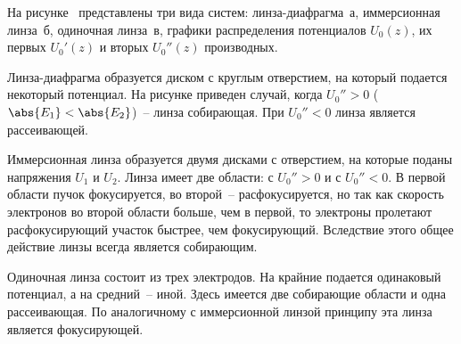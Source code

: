 На рисунке~ представлены три вида систем: линза-диафрагма~а,
иммерсионная линза~б, одиночная линза~в, графики распределения потенциалов
\( U_0(z) \), их первых \( U_0'(z) \) и вторых \( U_0''(z) \) производных.

Линза-диафрагма образуется диском с круглым отверстием, на который подается
некоторый потенциал. На рисунке приведен случай, когда \( U_0'' > 0 \)
(\( \abs{E_1} < \abs{E_2} \))~-- линза собирающая. При \( U_0'' < 0 \) линза
является рассеивающей.

Иммерсионная линза образуется двумя дисками с отверстием, на которые поданы
напряжения \( U_1 \) и \( U_2 \). Линза имеет две области: с \( U_0'' > 0 \) и
с \( U_0'' < 0 \). В первой области пучок фокусируется, во второй~--
расфокусируется, но так как скорость электронов во второй области больше, чем в
первой, то электроны пролетают расфокусирующий участок быстрее, чем
фокусирующий. Вследствие этого общее действие линзы всегда является собирающим.

Одиночная линза состоит из трех электродов. На крайние подается одинаковый
потенциал, а на средний~-- иной. Здесь имеется две собирающие области и одна
рассеивающая. По аналогичному с иммерсионной линзой принципу эта линза является
фокусирующей.
